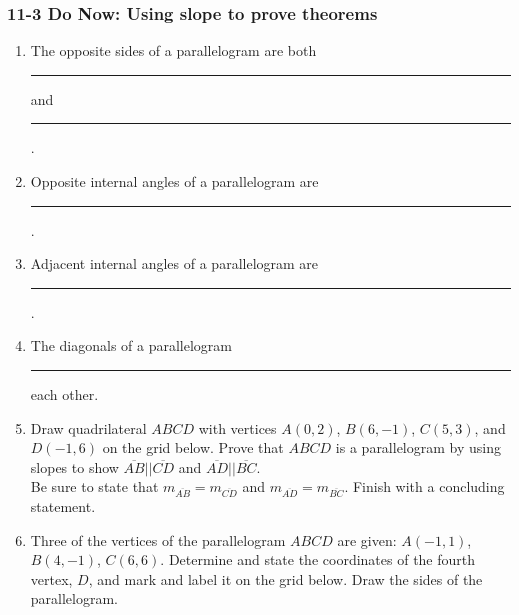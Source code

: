 \documentclass[12pt, twoside]{article}
\begin{document}
\subsubsection*{11-3 Do Now: Using slope to prove theorems}
  \begin{enumerate}

\item The opposite sides of a parallelogram are both \rule{4cm}{0.1mm} and \rule{4cm}{0.1mm}. \vspace{0.3cm}
\item Opposite internal angles of a parallelogram are \rule{4cm}{0.1mm} . \vspace{0.5cm}
\item Adjacent internal angles of a parallelogram are \rule{4cm}{0.1mm}.  \vspace{0.5cm}
\item The diagonals of a parallelogram \rule{4cm}{0.1mm} each other.  \vspace{0.5cm}

\item Draw quadrilateral $ABCD$ with vertices $A(0, 2)$, $B(6,-1)$, $C(5,3)$, and $D(-1,6)$ on the grid below. Prove that $ABCD$ is a parallelogram by using slopes to show $\overline{AB} || \overline{CD}$ and $\overline{AD} || \overline{BC}$. \\[0.5cm]
Be sure to state that $m_{\overline{AB}}=m_{\overline{CD}}$ and $m_{\overline{AD}}=m_{\overline{BC}}$. Finish with a concluding statement.\\[1cm]

\newpage
\item Three of the vertices of the parallelogram $ABCD$ are given: $A(-1, 1)$, $B(4,-1)$, $C(6, 6)$. Determine and state the coordinates of the fourth vertex, $D$, and mark and label it on the grid below. Draw the sides of the parallelogram.
  \begin{center}
  \end{center}


\end{enumerate}
\end{document}
